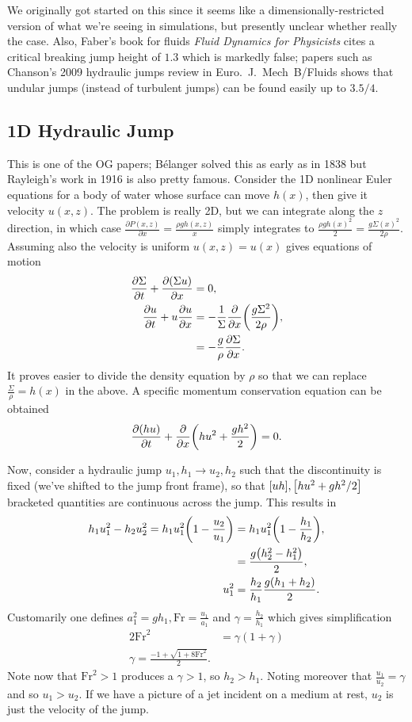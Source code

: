 \documentclass[11pt,
        usenames, %
        dvipsnames %
    ]{report}
\newcommand*{\pd}[2]{\frac{\partial#1}{\partial#2}}
\DeclarePairedDelimiter\p{\lparen}{\rparen}
\DeclarePairedDelimiter\s{\lbrack}{\rbrack}
\begin{document}
We originally got started on this since it seems like a dimensionally-restricted
version of what we're seeing in simulations, but presently unclear whether
really the case. Also, Faber's book for fluids \emph{Fluid Dynamics for
Physicists} cites a critical breaking jump height of $1.3$ which is markedly
false; papers such as Chanson's 2009 hydraulic jumps review in Euro.\ J.\ Mech\
B/Fluids shows that undular jumps (instead of turbulent jumps) can be found
easily up to $3.5/4$.

\subsection{1D Hydraulic Jump}

This is one of the OG papers; B\'elanger solved this as early as in 1838 but
Rayleigh's work in 1916 is also pretty famous. Consider the 1D nonlinear Euler
equations for a body of water whose surface can move $h(x)$, then give it
velocity $u(x, z)$. The problem is really 2D, but we can integrate along the $z$
direction, in which case $\pd{P(x, z)}{x} = \frac{\rho g h(x, z)}{x}$ simply
integrates to $\frac{\rho g h(x)^2}{2} = \frac{g\Sigma(x)^2}{2\rho}$. Assuming
also the velocity is uniform $u(x, z) = u(x)$ gives equations of motion
\begin{align}
    \pd{\Sigma}{t} + \pd{(\Sigma u)}{x} &= 0,\\
    \pd{u}{t} + u\pd{u}{x} &=
        -\frac{1}{\Sigma}\pd{}{x}\p*{\frac{g\Sigma^2}{2\rho}},\nonumber\\
        &= -\frac{g}{\rho}\pd{\Sigma}{x}.
\end{align}
It proves easier to divide the density equation by $\rho$ so that we can replace
$\frac{\Sigma}{\rho} = h(x)$ in the above. A specific momentum conservation
equation can be obtained
\begin{equation}
    \pd{(hu)}{t} + \pd{}{x}\p*{hu^2 + \frac{gh^2}{2}} = 0.
\end{equation}

Now, consider a hydraulic jump $u_1, h_1 \to u_2, h_2$ such that the
discontinuity is fixed (we've shifted to the jump front frame), so that
$\s*{uh}, \s*{hu^2 + gh^2/2}$ bracketed quantities are continuous across the jump.
This results in
\begin{align}
    h_1u_1^2 - h_2u_2^2 = h_1u_1^2\p*{1 - \frac{u_2}{u_1}}
        &= h_1u_1^2\p*{1 - \frac{h_1}{h_2}},\nonumber\\
        &= \frac{g\p*{h_2^2 - h_1^2}}{2},\nonumber\\
    u_1^2 &= \frac{h_2}{h_1}\frac{g\p*{h_1 + h_2}}{2}.
\end{align}
Customarily one defines $a_1^2 = gh_1, \mathrm{Fr} =
\frac{u_1}{a_1}$ and $\gamma = \frac{h_2}{h_1}$ which gives simplification
\begin{align}
    2\mathrm{Fr}^2 &= \gamma(1 + \gamma)\nonumber\\
    \gamma = \frac{-1 + \sqrt{1 + 8\mathrm{Fr}^2}}{2}.
\end{align}
Note now that $\mathrm{Fr}^2 > 1$ produces a $\gamma > 1$, so $h_2 > h_1$.
Noting moreover that $\frac{u_1}{u_2} = \gamma$ and so $u_1 > u_2$. If we have a
picture of a jet incident on a medium at rest, $u_2$ is just the velocity of the
jump.
\end{document}
